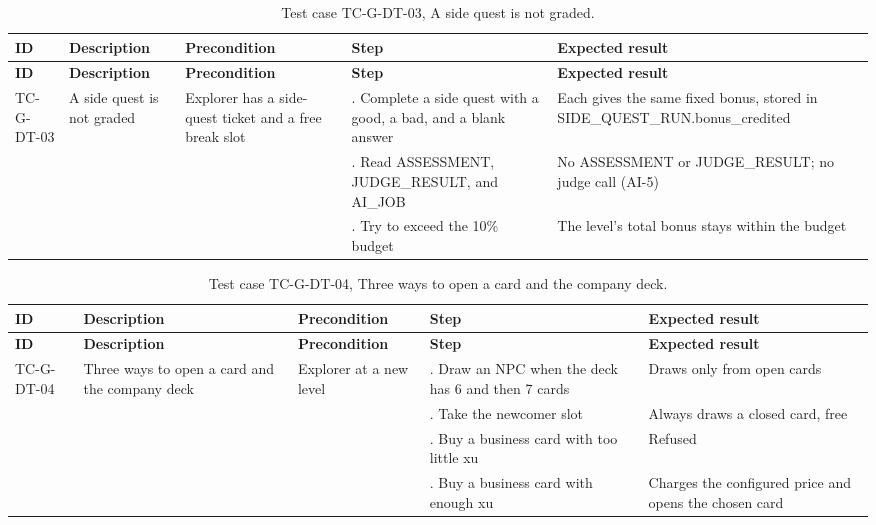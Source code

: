 {\small
\begin{longtable}{|>{\raggedright\arraybackslash}p{}|>{\raggedright\arraybackslash}p{}|>{\raggedright\arraybackslash}p{}|>{\raggedright\arraybackslash}p{}|>{\raggedright\arraybackslash}p{}|}
\caption{Test case TC-G-DT-03, A side quest is not graded.} \\
\hline
\textbf{ID} & \textbf{Description} & \textbf{Precondition} & \textbf{Step} & \textbf{Expected result} \\ \hline
\endfirsthead
\hline
\textbf{ID} & \textbf{Description} & \textbf{Precondition} & \textbf{Step} & \textbf{Expected result} \\ \hline
\endhead
TC-G-DT-03 & A side quest is not graded & Explorer has a side-quest ticket and a free break slot & 1. Complete a side quest with a good, a bad, and a blank answer & Each gives the same fixed bonus, stored in SIDE\_QUEST\_RUN.bonus\_credited \\ \hline
 &  &  & 2. Read ASSESSMENT, JUDGE\_RESULT, and AI\_JOB & No ASSESSMENT or JUDGE\_RESULT; no judge call (AI-5) \\ \hline
 &  &  & 3. Try to exceed the 10\% budget & The level's total bonus stays within the budget \\ \hline
\end{longtable}
}

{\small
\begin{longtable}{|>{\raggedright\arraybackslash}p{}|>{\raggedright\arraybackslash}p{}|>{\raggedright\arraybackslash}p{}|>{\raggedright\arraybackslash}p{}|>{\raggedright\arraybackslash}p{}|}
\caption{Test case TC-G-DT-04, Three ways to open a card and the company deck.} \\
\hline
\textbf{ID} & \textbf{Description} & \textbf{Precondition} & \textbf{Step} & \textbf{Expected result} \\ \hline
\endfirsthead
\hline
\textbf{ID} & \textbf{Description} & \textbf{Precondition} & \textbf{Step} & \textbf{Expected result} \\ \hline
\endhead
TC-G-DT-04 & Three ways to open a card and the company deck & Explorer at a new level & 1. Draw an NPC when the deck has 6 and then 7 cards & Draws only from open cards \\ \hline
 &  &  & 2. Take the newcomer slot & Always draws a closed card, free \\ \hline
 &  &  & 3. Buy a business card with too little xu & Refused \\ \hline
 &  &  & 4. Buy a business card with enough xu & Charges the configured price and opens the chosen card \\ \hline
\end{longtable}
}

